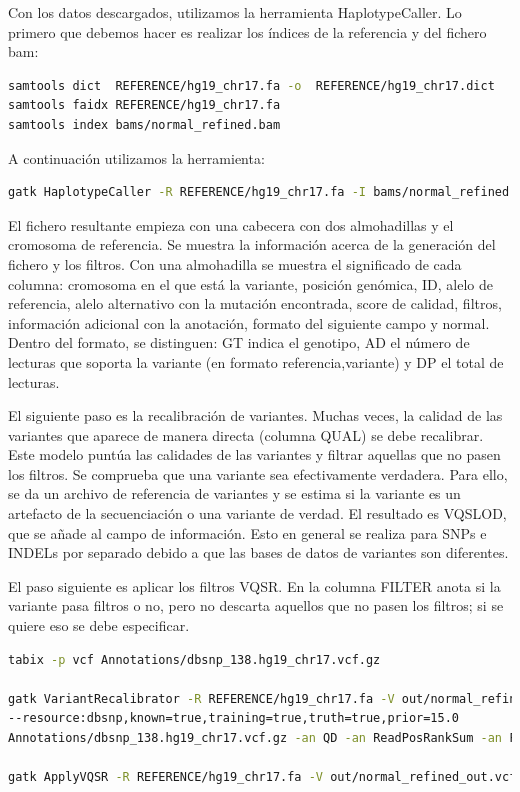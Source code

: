 Con los datos descargados, utilizamos la herramienta HaplotypeCaller. Lo primero que debemos hacer es realizar los índices de la referencia y del fichero bam:
\begin{lstlisting}[language=bash]
samtools dict  REFERENCE/hg19_chr17.fa -o  REFERENCE/hg19_chr17.dict
samtools faidx REFERENCE/hg19_chr17.fa
samtools index bams/normal_refined.bam
\end{lstlisting}

A continuación utilizamos la herramienta:
\begin{lstlisting}[language=bash]
gatk HaplotypeCaller -R REFERENCE/hg19_chr17.fa -I bams/normal_refined.bam -O out/normal_refined_out.vcf
\end{lstlisting}

El fichero resultante empieza con una cabecera con dos almohadillas y el cromosoma de referencia. Se muestra la información acerca de la generación del fichero y los filtros. Con una almohadilla se muestra el significado de cada columna: cromosoma en el que está la variante, posición genómica, ID, alelo de referencia, alelo alternativo con la mutación encontrada, score de calidad, filtros, información adicional con la anotación, formato del siguiente campo y normal. Dentro del formato, se distinguen: GT indica el genotipo, AD el número de lecturas que soporta la variante (en formato referencia,variante) y DP el total de lecturas.

El siguiente paso es la recalibración de variantes. Muchas veces, la calidad de las variantes que aparece de manera directa (columna QUAL) se debe recalibrar. Este modelo puntúa las calidades de las variantes y filtrar aquellas que no pasen los filtros. Se comprueba que una variante sea efectivamente verdadera. Para ello, se da un archivo de referencia de variantes y se estima si la variante es un artefacto de la secuenciación o una variante de verdad. El resultado es VQSLOD, que se añade al campo de información. Esto en general se realiza para SNPs e INDELs por separado debido a que las bases de datos de variantes son diferentes. 

El paso siguiente es aplicar los filtros VQSR. En la columna FILTER anota si la variante pasa filtros o no, pero no descarta aquellos que no pasen los filtros; si se quiere eso se debe especificar.
\begin{lstlisting}[language=bash]
tabix -p vcf Annotations/dbsnp_138.hg19_chr17.vcf.gz

gatk VariantRecalibrator -R REFERENCE/hg19_chr17.fa -V out/normal_refined_out.vcf
--resource:dbsnp,known=true,training=true,truth=true,prior=15.0
Annotations/dbsnp_138.hg19_chr17.vcf.gz -an QD -an ReadPosRankSum -an FS -an SOR -mode BOTH -O out/output_normal_refined.recal --tranches-file out/output_normal_refined.tranches

gatk ApplyVQSR -R REFERENCE/hg19_chr17.fa -V out/normal_refined_out.vcf -O out/output_normal_refined.recalibrated --truth-sensitivity-filter-level 99.0 --tranches-file out/output_normal_refined.tranches --recal-file out/output_normal_refined.recal -mode BOTH
\end{lstlisting}

